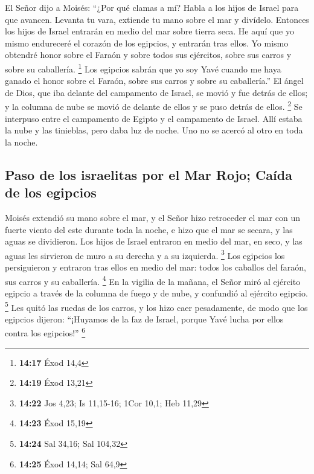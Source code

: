 \begin{paracol}{2}
 El Señor dijo a Moisés: ``¿Por qué clamas a mí? Habla a
los hijos de Israel para que avancen.  Levanta tu vara,
extiende tu mano sobre el mar y divídelo. Entonces los hijos de Israel
entrarán en medio del mar sobre tierra seca.  He aquí que
yo mismo endureceré el corazón de los egipcios, y entrarán tras ellos.
Yo mismo obtendré honor sobre el Faraón y sobre todos sus ejércitos,
sobre sus carros y sobre su caballería. \footnote{\textbf{14:17} Éxod
  14,4}  Los egipcios sabrán que yo soy Yavé cuando me
haya ganado el honor sobre el Faraón, sobre sus carros y sobre su
caballería.''  El ángel de Dios, que iba delante del
campamento de Israel, se movió y fue detrás de ellos; y la columna de
nube se movió de delante de ellos y se puso detrás de ellos. \footnote{\textbf{14:19}
  Éxod 13,21}  Se interpuso entre el campamento de Egipto
y el campamento de Israel. Allí estaba la nube y las tinieblas, pero
daba luz de noche. Uno no se acercó al otro en toda la noche.

\hypertarget{paso-de-los-israelitas-por-el-mar-rojo-cauxedda-de-los-egipcios}{%
\subsection{Paso de los israelitas por el Mar Rojo; Caída de los
egipcios}\label{paso-de-los-israelitas-por-el-mar-rojo-cauxedda-de-los-egipcios}}

 Moisés extendió su mano sobre el mar, y el Señor hizo
retroceder el mar con un fuerte viento del este durante toda la noche, e
hizo que el mar se secara, y las aguas se dividieron. 
Los hijos de Israel entraron en medio del mar, en seco, y las aguas les
sirvieron de muro a su derecha y a su izquierda. \footnote{\textbf{14:22}
  Jos 4,23; Is 11,15-16; 1Cor 10,1; Heb 11,29}  Los
egipcios los persiguieron y entraron tras ellos en medio del mar: todos
los caballos del faraón, sus carros y su caballería. \footnote{\textbf{14:23}
  Éxod 15,19}  En la vigilia de la mañana, el Señor miró
al ejército egipcio a través de la columna de fuego y de nube, y
confundió al ejército egipcio. \footnote{\textbf{14:24} Sal 34,16; Sal
  104,32}  Les quitó las ruedas de los carros, y los hizo
caer pesadamente, de modo que los egipcios dijeron: ``¡Huyamos de la faz
de Israel, porque Yavé lucha por ellos contra los egipcios!''
\footnote{\textbf{14:25} Éxod 14,14; Sal 64,9}


\end{paracol}
